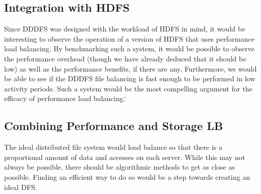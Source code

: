 \documentclass[twoside]{article}
\begin{document}
\begin{multicols}{2}
\subsection*{Integration with HDFS}
Since DDDFS was designed with the workload of HDFS in mind, it would be interesting to observe the operation of a version of HDFS that uses performance load balancing. By benchmarking such a system, it would be possible to observe the performance overhead (though we have already deduced that it should be low) as well as the performance benefits, if there are any. Furthermore, we would be able to see if the DDDFS file balancing is fast enough to be performed in low activity periods. Such a system would be the most compelling argument for the efficacy of performance load balancing.`	

\subsection*{Combining Performance and Storage LB}
The ideal distributed file system would load balance so that there is a proportional amount of data and accesses on each server. While this may not always be possible, there should be algorithmic methods to get as close as possible. Finding an efficient way to do so would be a step towards creating an ideal DFS. 




\end{multicols}
\end{document}
